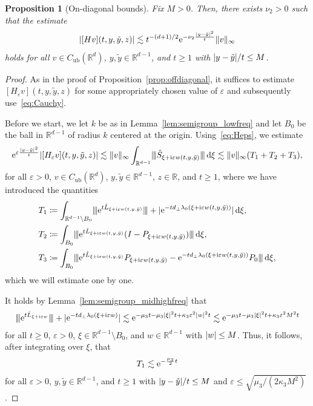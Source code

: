 \documentclass[12pt,oneside,a4paper,reqno]{amsart}
\numberwithin{equation}{section}
\newtheorem{proposition}[theorem]{Proposition}
\theoremstyle{definition}
\theoremstyle{remark}
\newcommand{\bbR}{{\mathbb R}}
\newcommand{\rd}{{\,\rm{d}}}
\newcommand{\eps}{\varepsilon}
\newcommand{\Cub}{{C_{\mathrm{ub}}}}
\newcommand{\re}{{\rm e}}
\newcommand{\ri}{{\rm i}}
\newcommand{\yt}{\tilde{y}}
\DeclarePairedDelimiter{\abs}{\lvert}{\rvert}
\DeclarePairedDelimiter{\norm}{\lVert}{\rVert}
\DeclarePairedDelimiter{\tnorm}{\lvert\kern-0.25ex\lvert\kern-0.25ex\lvert}{\rvert\kern-0.25ex\rvert\kern-0.25ex\rvert}
\begin{document}
\begin{proposition}[On-diagonal bounds]
    \label{prop:ondiagonal}
    Fix $M > 0$.
    Then, there exists $\nu_2 > 0$ such that the estimate
    \begin{equation}
        \label{eq:ondiagonal}
        \abs{[Hv](t,y,\tilde{y},z)} \lesssim t^{-(d+1)/2} \re^{-\nu_2 \frac{\abs{y - \tilde{y}}^2}{t}} \norm{v}_\infty
    \end{equation}
    holds for all $v \in \Cub(\bbR^{d})$, $y,\tilde{y} \in \bbR^{d-1}$, and $t \geq 1$ with $\abs{y - \tilde{y}} / t \leq M$.
\end{proposition}
\begin{proof}
    As in the proof of Proposition~\ref{prop:offdiagonal}, it suffices to estimate $[H_{\eps}v](t,y,\tilde{y},z)$ for some appropriately chosen value of $\eps$ and subsequently use~\eqref{eq:Cauchy}.
    
    Before we start, we let $k$ be as in Lemma~\ref{lem:semigroup_lowfreq} and let $B_0$ be the ball in $\bbR^{d-1}$ of radius $k$ centered at the origin. Using~\eqref{eq:Heps}, we estimate
    \begin{align}
        \label{eq:ondiagonal_T1234}
        \re^{\eps \frac{\abs{y - \tilde{y}}^2}{t}}\abs{[H_{\eps}v](t,y,\tilde{y},z)} \lesssim \|v\|_\infty \int_{\bbR^{d-1}}\tnorm{\hat{S}_{\xi + \ri \eps w(t,y,\yt)} } \rd \xi \lesssim \|v\|_\infty(T_1 + T_2 + T_3),
    \end{align}
    for all $\eps > 0$, $v \in \Cub(\bbR^{d})$, $y,\tilde{y} \in \bbR^{d-1}$, $z \in \bbR$, and $t \geq 1$, where we have introduced the quantities
    \begin{align*}
        T_1 &\coloneq \int_{\bbR^{d-1} \setminus B_0}\tnorm{\re^{t\hat{L}_{\xi + \ri \eps w(t,y,\yt)}}} + \abs{\re^{-td_{\bot}\lambda_0(\xi + \ri \eps w(t,y,\yt))}} \rd \xi, \\
        T_2 &\coloneq \int_{B_0}\tnorm{\re^{t\hat{L}_{\xi + \ri \eps w(t,y,\yt)}}(I - P_{\xi + \ri \eps w(t,y,\yt)})} \rd \xi, \\
        T_3 &\coloneq \int_{B_0}\tnorm{\re^{t\hat{L}_{\xi + \ri \eps w(t,y,\yt)}}P_{\xi + \ri \eps w(t,y,\yt)} - \re^{-td_{\bot}\lambda_0(\xi + \ri\eps w(t,y,\yt))}P_0} \rd \xi,
    \end{align*}
    which we will estimate one by one.
        
    It holds by Lemma~\ref{lem:semigroup_midhighfreq} that
    \begin{align*}
        \tnorm{\re^{t\hat{L}_{\xi + \ri \eps w}}} + \abs{\re^{-td_{\bot}\lambda_0(\xi+ \ri \eps w)}} 
        \lesssim \re^{-\mu_3 t - \mu_3\abs{\xi}^2 t + \kappa_3 \eps^2 \abs{w}^2 t} 
        \lesssim \re^{-\mu_3 t - \mu_3\abs{\xi}^2 t + \kappa_3 \eps^2 M^2 t}
    \end{align*}
    for all $t \geq 0$, $\eps > 0$, $\xi \in \bbR^{d-1} \setminus B_0$, and $w \in \bbR^{d-1}$ with $\abs{w} \leq M$. Thus, it follows, after  integrating over $\xi$, that
    \begin{align*}
        T_1 \lesssim \re^{-\frac{\mu_3}{2} t}
    \end{align*}
    for all $\eps > 0$, $y,\tilde{y} \in \bbR^{d-1}$, and $t \geq 1$ with $\abs{y - \tilde{y}} / t \leq M$ and $\eps \leq \sqrt{\mu_3 / (2 \kappa_3 M^2)}$.
    

\end{proof}
\end{document}

